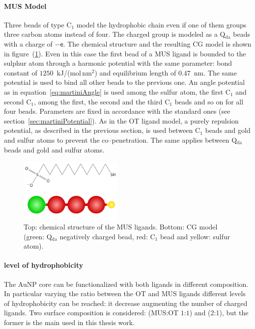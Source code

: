 \paragraph{\textbf{MUS Model}} Three \martini beads of type C$_1$ model the hydrophobic chain even if one of them groups three carbon atoms instead of four. The charged group is modeled as a Q$_\text{da}$ beads with a charge of $-\mathsf{e}$. The chemical structure and the resulting \ac{CG} \martini model is shown in figure~(\ref{fig:mus}). Even in this case the first bead of a \ac{MUS} ligand is bounded to the sulphur atom through a harmonic potential with the same parameter: bond constant of $1250$~kJ/(mol\,nm$^2$) and equilibrium length of $0.47$~nm. The same potential is used to bind all other beads to the previous one. An angle potential as in equation~\eqref{eq:martiniAngle} is used among the sulfur atom, the first C$_1$ and second C$_1$, among the first, the second and the third C$_1$ beads and so on for all four beads. Parameters are fixed in accordance with the standard \martini ones (see section~\ref{sec:martiniPotential}). As in the \ac{OT} ligand model, a purely repulsion potential, as described in the previous section, is used between C$_1$ beads and gold and sulfur atoms to prevent the co--penetration. The same applies between Q$_\text{da}$ beads and gold and sulfur atoms.
\begin{figure}
	\includegraphics[width=0.45\textwidth]{./img/MUS/MUS}
	\caption{Top: chemical structure of the \acs{MUS} ligands. Bottom: \acs{CG} \martini model (green: Q$_\text{da}$ negatively charged bead, red: C$_1$ bead and yellow: sulfur atom).}
	\label{fig:mus}
\end{figure}

\paragraph{\textbf{level of hydrophobicity}} The Au\ac{NP} core can be functionalized with both ligands in different composition. In particular varying the ratio between the \ac{OT} and \ac{MUS} ligands different levels of hydrophobicity can be reached: it decrease augmenting the number of charged ligands. Two surface composition is considered: (\ac{MUS}:\ac{OT} $1$:$1$) and (2:1), but the former is the main used in this thesis work.

